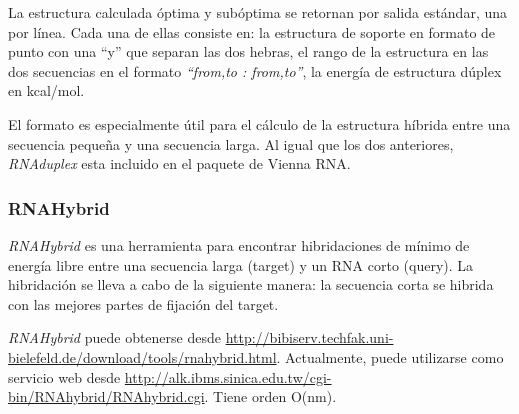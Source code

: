 \par La estructura calculada óptima y subóptima se retornan por salida estándar, una por línea. Cada una de ellas consiste en: la estructura de soporte en formato de punto con una ``y'' que separan las dos hebras, el rango de la estructura en las dos secuencias en el formato \emph{``from,to : from,to''}, la energía de estructura dúplex en kcal/mol.

\par El formato es especialmente útil para el cálculo de la estructura híbrida entre una secuencia pequeña y una secuencia larga. Al igual que los dos anteriores, \emph{RNAduplex} esta incluido en el paquete de Vienna RNA\cite{vienna}.         

\subsubsection{RNAHybrid}
\par \emph{RNAHybrid\cite{rnahybrid}} es una herramienta para encontrar hibridaciones de mínimo de energía libre entre una
secuencia larga (target) y un RNA corto (query). La hibridación se lleva a cabo de la siguiente manera: la secuencia corta se hibrida con las mejores partes de fijación del target.

\par \emph{RNAHybrid} puede obtenerse desde \url{http://bibiserv.techfak.uni-bielefeld.de/download/tools/rnahybrid.html}.  Actualmente, puede utilizarse como servicio web desde \url{http://alk.ibms.sinica.edu.tw/cgi-bin/RNAhybrid/RNAhybrid.cgi}.
Tiene orden O(nm).
